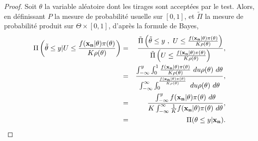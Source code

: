 \begin{proof}%
Soit ${\theta}$ la variable aléatoire dont les tirages sont acceptées par le test. Alors, en définissant $P$ la mesure de probabilité usuelle sur $[0,1]$, et $\tilde{\Pi}$ la mesure de probabilité produit sur $\Theta\times[0,1]$, d'après la formule de Bayes,
\begin{eqnarray*}
\Pi\left(\tilde{\theta}\leq y | U \leq \frac{f({\bf x_n}|\theta)\pi(\theta)}{K\rho(\theta)} \right) & = & \frac{\tilde{\Pi}\left(\tilde{\theta}\leq y \ , \ U \leq \frac{f({\bf x_n}|\theta)\pi(\theta)}{K\rho(\theta)}\right)}{\tilde{\Pi}\left(U \leq \frac{f({\bf x_n}|\theta)\pi(\theta)}{K\rho(\theta)}\right)}, \\
& = & \frac{\int_{-\infty}^y \int_0^1 \frac{f({\bf x_n}|\theta)\pi(\theta)}{K\rho(\theta)} \ du \rho(\theta) \ d\theta}{\int_{-\infty}^{\infty} \int_0^{\frac{f({\bf x_n}|\theta)\pi(\theta)}{K\rho(\theta)}} \ du \rho(\theta) \ d\theta}, \\
& = & \frac{\int_{-\infty}^y f({\bf x_n}|\theta)\pi(\theta) \ d\theta}{K\int_{-\infty}^{\infty} \frac{1}{K}f({\bf x_n}|\theta)\pi(\theta) \ d\theta}, \\
& = & \Pi(\theta\leq y|{\bf x_n}).
\end{eqnarray*}
\end{proof}

